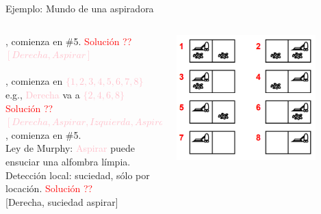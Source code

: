 \documentclass{beamer}
\theoremstyle{definition}
\theoremstyle{theorem}
\theoremstyle{remark}
\begin{document}
\begin{frame}{Ejemplo: Mundo de una aspiradora}
    \begin{columns}
        \begin{column}{0.6\textwidth}
            , comienza en \#5.
            \textcolor{red}{Solución ??}\\
            \textcolor{Pink}{$[Derecha, Aspirar]$}\\~\\
                   
            , comienza en
            \textcolor{Pink}{$\{1,2,3,4,5,6,7,8\}$} e.g., \textcolor{Pink}{Derecha} va a \textcolor{Pink}{$\{2,4,6,8\}$}
            \textcolor{red}{Solución ??}\\
            \textcolor{Pink}{$[Derecha, Aspirar, Izquierda, Aspirar]$}\\
                    
            , comienza en \#5.\\
            Ley de Murphy: \textcolor{Pink}{Aspirar} puede ensuciar una alfombra l\'impia.\\
            Detecci\'on local: suciedad, s\'olo por locaci\'on.
            \textcolor{red}{Soluci\'on ??}\\
            {[Derecha,  suciedad  aspirar]}
        \end{column}
        \begin{column}{0.4\textwidth}
            \includegraphics[width=0.8\textwidth]{9_image_example1.PNG}
        \end{column}
    \end{columns}
\end{frame}
\end{document}
